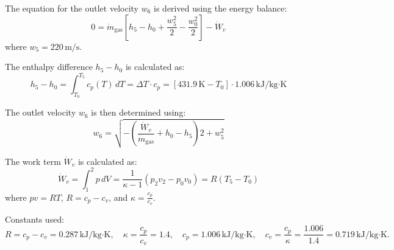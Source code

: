 The equation for the outlet velocity \( w_6 \) is derived using the energy balance:  
\[
0 = \dot{m}_{\text{gas}} \left[ h_5 - h_0 + \frac{w_5^2}{2} - \frac{w_0^2}{2} \right] - \dot{W}_v
\]  
where \( w_5 = 220 \, \text{m/s} \).  

The enthalpy difference \( h_5 - h_0 \) is calculated as:  
\[
h_5 - h_0 = \int_{T_0}^{T_5} c_p(T) \, dT = \Delta T \cdot c_p = \left[ 431.9 \, \text{K} - T_0 \right] \cdot 1.006 \, \text{kJ/kg·K}
\]  

The outlet velocity \( w_6 \) is then determined using:  
\[
w_6 = \sqrt{-\left( \frac{\dot{W}_v}{\dot{m}_{\text{gas}}} + h_0 - h_5 \right) 2 + w_5^2}
\]  

The work term \( \dot{W}_v \) is calculated as:  
\[
\dot{W}_v = \int_1^2 p \, dV = \frac{1}{\kappa - 1} \left( p_2 v_2 - p_0 v_0 \right) = R \left( T_5 - T_0 \right)
\]  
where \( p v = R T \), \( R = c_p - c_v \), and \( \kappa = \frac{c_p}{c_v} \).  

Constants used:  
\[
R = c_p - c_v = 0.287 \, \text{kJ/kg·K}, \quad \kappa = \frac{c_p}{c_v} = 1.4, \quad c_p = 1.006 \, \text{kJ/kg·K}, \quad c_v = \frac{c_p}{\kappa} = \frac{1.006}{1.4} = 0.719 \, \text{kJ/kg·K}.
\]